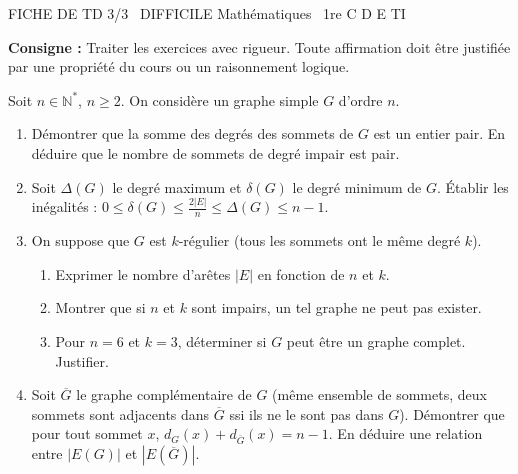 \documentclass[11pt]{article}
\begin{document}
\begin{tcolorbox}[enhanced,colback=popink,colframe=popink,arc=10pt,boxrule=0pt,left=12pt,right=12pt,top=9pt,bottom=9pt]
{\color{white}\popxbold\small FICHE DE TD 3/3 \textbullet\ DIFFICILE \hfill Mathématiques \textbullet\ 1re C D E TI\par}
\end{tcolorbox}
\vspace{4pt}
\noindent \textbf{Consigne :} Traiter les exercices avec rigueur. Toute affirmation doit être justifiée par une propriété du cours ou un raisonnement logique.

\begin{exercice}
Soit $n \in \mathbb{N}^*$, $n \ge 2$. On considère un graphe simple $G$ d'ordre $n$.
\begin{enumerate}
    \item Démontrer que la somme des degrés des sommets de $G$ est un entier pair. En déduire que le nombre de sommets de degré impair est pair.
    \item Soit $\Delta(G)$ le degré maximum et $\delta(G)$ le degré minimum de $G$. Établir les inégalités : $0 \le \delta(G) \le \frac{2|E|}{n} \le \Delta(G) \le n-1$.
    \item On suppose que $G$ est $k$-régulier (tous les sommets ont le même degré $k$).
    \begin{enumerate}
        \item Exprimer le nombre d'arêtes $|E|$ en fonction de $n$ et $k$.
        \item Montrer que si $n$ et $k$ sont impairs, un tel graphe ne peut pas exister.
        \item Pour $n=6$ et $k=3$, déterminer si $G$ peut être un graphe complet. Justifier.
    \end{enumerate}
    \item Soit $\overline{G}$ le graphe complémentaire de $G$ (même ensemble de sommets, deux sommets sont adjacents dans $\overline{G}$ ssi ils ne le sont pas dans $G$). Démontrer que pour tout sommet $x$, $d_G(x) + d_{\overline{G}}(x) = n-1$. En déduire une relation entre $|E(G)|$ et $|E(\overline{G})|$.
\end{enumerate}
\end{exercice}
\end{document}
